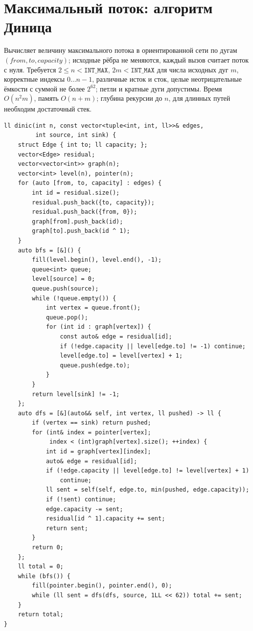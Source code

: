 \section{Максимальный поток: алгоритм Диница}
Вычисляет величину максимального потока в ориентированной сети по дугам $(from,to,capacity)$; исходные рёбра не меняются, каждый вызов считает поток с нуля.
Требуется $2\le n<\texttt{INT\_MAX}$, $2m<\texttt{INT\_MAX}$ для числа исходных дуг $m$, корректные индексы $0\ldots n-1$, различные исток и сток, целые неотрицательные ёмкости с суммой не более $2^{62}$; петли и кратные дуги допустимы.
Время $O(n^2m)$, память $O(n+m)$; глубина рекурсии до $n$, для длинных путей необходим достаточный стек.
\begin{lstlisting}[name=graphs_dinic]
ll dinic(int n, const vector<tuple<int, int, ll>>& edges,
         int source, int sink) {
    struct Edge { int to; ll capacity; };
    vector<Edge> residual;
    vector<vector<int>> graph(n);
    vector<int> level(n), pointer(n);
    for (auto [from, to, capacity] : edges) {
        int id = residual.size();
        residual.push_back({to, capacity});
        residual.push_back({from, 0});
        graph[from].push_back(id);
        graph[to].push_back(id ^ 1);
    }
    auto bfs = [&]() {
        fill(level.begin(), level.end(), -1);
        queue<int> queue;
        level[source] = 0;
        queue.push(source);
        while (!queue.empty()) {
            int vertex = queue.front();
            queue.pop();
            for (int id : graph[vertex]) {
                const auto& edge = residual[id];
                if (!edge.capacity || level[edge.to] != -1) continue;
                level[edge.to] = level[vertex] + 1;
                queue.push(edge.to);
            }
        }
        return level[sink] != -1;
    };
    auto dfs = [&](auto&& self, int vertex, ll pushed) -> ll {
        if (vertex == sink) return pushed;
        for (int& index = pointer[vertex];
             index < (int)graph[vertex].size(); ++index) {
            int id = graph[vertex][index];
            auto& edge = residual[id];
            if (!edge.capacity || level[edge.to] != level[vertex] + 1)
                continue;
            ll sent = self(self, edge.to, min(pushed, edge.capacity));
            if (!sent) continue;
            edge.capacity -= sent;
            residual[id ^ 1].capacity += sent;
            return sent;
        }
        return 0;
    };
    ll total = 0;
    while (bfs()) {
        fill(pointer.begin(), pointer.end(), 0);
        while (ll sent = dfs(dfs, source, 1LL << 62)) total += sent;
    }
    return total;
}
\end{lstlisting}

